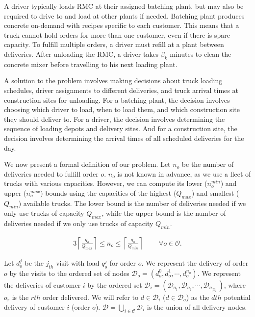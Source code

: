 \documentclass{article}
\begin{document}
A driver typically loads RMC at their assigned batching plant, but may also be required to drive to and load at other plants if needed. Batching plant produces concrete on-demand with recipes specific to each customer. This means that a truck cannot hold orders for more than one customer, even if there is spare capacity. To fulfill multiple orders, a driver must refill at a plant between deliveries. After unloading the RMC, a driver takes $\beta_k$ minutes to clean the concrete mixer before travelling to his next loading plant. %


A solution to the problem involves making decisions about truck loading schedules, driver assignments to different deliveries, and truck arrival times at construction sites for unloading. For a batching plant, the decision involves choosing which driver to load, when to load them, and which construction site they should deliver to. For a driver, the decision involves determining the sequence of loading depots and delivery sites. And for a construction site, the decision involves determining the arrival times of all scheduled deliveries for the day.

We now present a formal definition of our problem. Let $n_o$ be the number of deliveries needed to fulfill order $o$. $n_o$ is not known in advance, as we use a fleet of trucks with various capacities. However, we can compute its lower ($n_o^{min}$) and upper ($n_o^{max}$) bounds using the capacities of the highest ($Q_{max}$) and smallest ($Q_{min}$) available trucks. The lower bound is the number of deliveries needed if we only use trucks of capacity $Q_{max}$, while the upper bound is the number of deliveries needed if we only use trucks of capacity $Q_{min}$. 

\begin{alignat}{3}
    \label{mod:c1}
       \left\lceil \frac{q_o}{Q_{max}} \right\rceil \leq n_o \leq \left\lceil \frac{q_o}{Q_{min}} \right\rceil  & \text{ } & 
 \forall  o \in \mathcal{O}.
\end{alignat}

Let $d^j_{o}$ be the $j_{th}$ visit with load $q^j_{o}$ for order $o$. We represent the delivery of order $o$ by the visits to the ordered set of nodes $\mathcal{D}_o= \left(d^0_{o},d^1_{o},\cdots, d^{n_o}_{o}\right)$. We represent the deliveries of customer $i$ by the ordered set $\mathcal{D}_i= (\mathcal{D}_{o_1}, \mathcal{D}_{o_2},\cdots,\mathcal{D}_{o_{|O_i|}})$, where $o_r$ is the $rth$ order delivered. We will refer to $d \in \mathcal{D}_i$ ($d \in \mathcal{D}_o$) as the $dth$ potential delivery of customer $i$ (order $o$). $\mathcal{D}=\bigcup_{i\in \mathcal{C}} \mathcal{D}_i$ is the union of all delivery nodes. 
\end{document}
